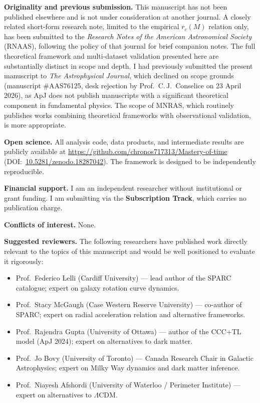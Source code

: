 \documentclass[12pt]{article}
\begin{document}
\bigskip

\textbf{Originality and previous submission.}
This manuscript has not been published elsewhere and is not under
consideration at another journal. A closely related short-form
research note, limited to the empirical $r_c(M)$ relation only, has
been submitted to the \textit{Research Notes of the American
Astronomical Society} (RNAAS), following the policy of that journal
for brief companion notes. The full theoretical framework and
multi-dataset validation presented here are substantially distinct in
scope and depth. I had previously submitted the present manuscript to
\textit{The Astrophysical Journal}, which declined on scope grounds
(manuscript \#AAS76125, desk rejection by Prof.\ C.\,J.\ Conselice on
23 April 2026), as ApJ does not publish manuscripts with a
significant theoretical component in fundamental physics. The scope of
MNRAS, which routinely publishes works combining theoretical
frameworks with observational validation, is more appropriate.

\bigskip

\textbf{Open science.}
All analysis code, data products, and intermediate results are
publicly available at
\url{https://github.com/chronos717313/Mastery-of-time}
(DOI:~\href{https://doi.org/10.5281/zenodo.18287042}{10.5281/zenodo.18287042}).
The framework is designed to be independently reproducible.

\bigskip

\textbf{Financial support.}
I am an independent researcher without institutional or grant funding.
I am submitting via the \textbf{Subscription Track}, which carries no
publication charge.

\bigskip

\textbf{Conflicts of interest.}
None.

\bigskip

\textbf{Suggested reviewers.}
The following researchers have published work directly relevant to the
topics of this manuscript and would be well positioned to evaluate it
rigorously:

\begin{itemize}
  \item Prof.\ Federico Lelli (Cardiff University) --- lead author of
  the SPARC catalogue; expert on galaxy rotation curve dynamics.
  \item Prof.\ Stacy McGaugh (Case Western Reserve University) ---
  co-author of SPARC; expert on radial acceleration relation and
  alternative frameworks.
  \item Prof.\ Rajendra Gupta (University of Ottawa) --- author of
  the CCC+TL model (ApJ 2024); expert on alternatives to dark matter.
  \item Prof.\ Jo Bovy (University of Toronto) --- Canada Research
  Chair in Galactic Astrophysics; expert on Milky Way dynamics and
  dark matter inference.
  \item Prof.\ Niayesh Afshordi (University of Waterloo / Perimeter
  Institute) --- expert on alternatives to $\Lambda$CDM.
\end{itemize}
\end{document}
